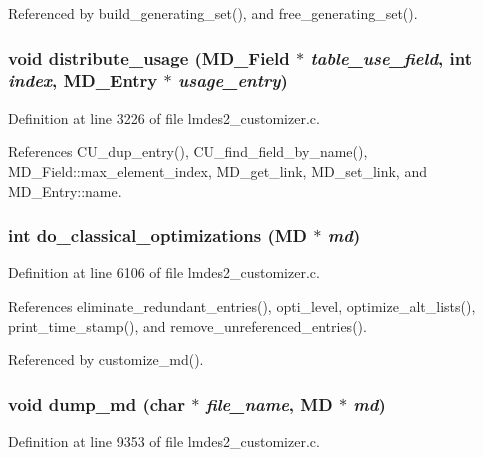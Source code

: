 Referenced by build\_\-generating\_\-set(), and free\_\-generating\_\-set().
\subsubsection{\setlength{\rightskip}{0pt plus 5cm}void distribute\_\-usage (\bf{MD\_\-Field} $\ast$ {\em table\_\-use\_\-field}, int {\em index}, \bf{MD\_\-Entry} $\ast$ {\em usage\_\-entry})}\label{lmdes2__customizer_8c_ec658bc2635a4784ff353fc3cad8bb0b}




Definition at line 3226 of file lmdes2\_\-customizer.c.

References CU\_\-dup\_\-entry(), CU\_\-find\_\-field\_\-by\_\-name(), MD\_\-Field::max\_\-element\_\-index, MD\_\-get\_\-link, MD\_\-set\_\-link, and MD\_\-Entry::name.
\subsubsection{\setlength{\rightskip}{0pt plus 5cm}int do\_\-classical\_\-optimizations (\bf{MD} $\ast$ {\em md})}\label{lmdes2__customizer_8c_609ff85ad7bd0ce810ba3f0732aef469}




Definition at line 6106 of file lmdes2\_\-customizer.c.

References eliminate\_\-redundant\_\-entries(), opti\_\-level, optimize\_\-alt\_\-lists(), print\_\-time\_\-stamp(), and remove\_\-unreferenced\_\-entries().

Referenced by customize\_\-md().
\subsubsection{\setlength{\rightskip}{0pt plus 5cm}void dump\_\-md (char $\ast$ {\em file\_\-name}, \bf{MD} $\ast$ {\em md})}\label{lmdes2__customizer_8c_e15b6758241bc43ed7472236b84c63bd}




Definition at line 9353 of file lmdes2\_\-customizer.c.


